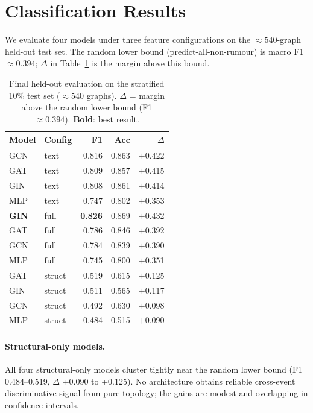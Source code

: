 \documentclass[runningheads]{llncs}
\begin{document}
\section{Classification Results}
\label{sec:results}

We evaluate four models under three feature configurations on the $\approx 540$-graph
held-out test set. The random lower bound (predict-all-non-rumour) is macro
F1 $\approx 0.394$; $\Delta$ in Table~\ref{tab:results} is the margin above this bound.

\begin{table}[t]
\caption{Final held-out evaluation on the stratified 10\% test set ($\approx 540$
graphs). $\Delta$ = margin above the random lower bound (F1 $\approx 0.394$).
\textbf{Bold}: best result.}
\label{tab:results}
\centering
\begin{tabular}{llrrr}
\toprule
Model & Config & F1 & Acc & $\Delta$ \\
\midrule
GCN  & text   & 0.816 & 0.863 & $+$0.422 \\
GAT  & text   & 0.809 & 0.857 & $+$0.415 \\
GIN  & text   & 0.808 & 0.861 & $+$0.414 \\
MLP  & text   & 0.747 & 0.802 & $+$0.353 \\
\midrule
\textbf{GIN} & full & \textbf{0.826} & 0.869 & $+$0.432 \\
GAT  & full   & 0.786 & 0.846 & $+$0.392 \\
GCN  & full   & 0.784 & 0.839 & $+$0.390 \\
MLP  & full   & 0.745 & 0.800 & $+$0.351 \\
\midrule
GAT  & struct & 0.519 & 0.615 & $+$0.125 \\
GIN  & struct & 0.511 & 0.565 & $+$0.117 \\
GCN  & struct & 0.492 & 0.630 & $+$0.098 \\
MLP  & struct & 0.484 & 0.515 & $+$0.090 \\
\bottomrule
\end{tabular}
\end{table}

\paragraph{Structural-only models.}
All four structural-only models cluster tightly near the random lower bound
(F1 0.484--0.519, $\Delta$ +0.090 to +0.125). No architecture obtains
reliable cross-event discriminative signal from pure topology; the gains are
modest and overlapping in confidence intervals.
\end{document}
